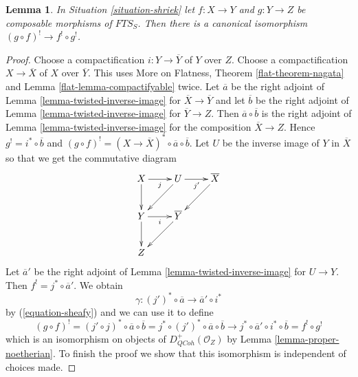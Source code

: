 \documentclass{stacks-project}
\theoremstyle{plain}
\newtheorem{lemma}[subsection]{Lemma}
\theoremstyle{definition}
\theoremstyle{remark}
\numberwithin{equation}{subsection}
\def\QCoh{\mathit{QCoh}}
\begin{document}
\begin{lemma}
\label{lemma-upper-shriek-composition}
In Situation \ref{situation-shriek} let $f : X \to Y$ and $g : Y \to Z$
be composable morphisms of $\textit{FTS}_S$. Then there is a canonical
isomorphism $(g \circ f)^! \to f^! \circ g^!$.
\end{lemma}

\begin{proof}
Choose a compactification $i : Y \to \overline{Y}$ of $Y$ over $Z$.
Choose a compactification $X \to \overline{X}$ of $X$ over
$\overline{Y}$. This uses More on Flatness, Theorem \ref{flat-theorem-nagata}
and Lemma \ref{flat-lemma-compactifyable} twice.
Let $\overline{a}$ be the
right adjoint of Lemma \ref{lemma-twisted-inverse-image} for
$\overline{X} \to \overline{Y}$ and let $\overline{b}$
be the
right adjoint of Lemma \ref{lemma-twisted-inverse-image} for
$\overline{Y} \to Z$.
Then $\overline{a} \circ \overline{b}$ is the
right adjoint of Lemma \ref{lemma-twisted-inverse-image} for
the composition $\overline{X} \to Z$.
Hence $g^! = i^* \circ \overline{b}$ and
$(g \circ f)^! = (X \to \overline{X})^* \circ \overline{a} \circ \overline{b}$.
Let $U$ be the inverse image of $Y$ in $\overline{X}$
so that we get the commutative diagram
$$
\xymatrix{
X \ar[r]_j \ar[d] & U \ar[dl] \ar[r]_{j'} & \overline{X} \ar[dl] \\
Y \ar[r]_i \ar[d] & \overline{Y} \ar[dl] \\
Z
}
$$
Let $\overline{a}'$ be the
right adjoint of Lemma \ref{lemma-twisted-inverse-image} for
$U \to Y$.
Then $f^! = j^* \circ \overline{a}'$. We obtain
$$
\gamma : (j')^* \circ \overline{a} \to \overline{a}' \circ i^*
$$
by (\ref{equation-sheafy}) and we can use it to define
$$
(g \circ f)^! =
(j' \circ j)^* \circ \overline{a} \circ \overline{b} =
j^* \circ (j')^* \circ \overline{a} \circ \overline{b}
\to
j^* \circ \overline{a}' \circ i^* \circ \overline{b} =
f^! \circ g^!
$$
which is an isomorphism on objects of $D_\QCoh^+(\mathcal{O}_Z)$ by
Lemma \ref{lemma-proper-noetherian}. To finish the proof we show that
this isomorphism is independent of choices made.


\end{proof}
\end{document}
